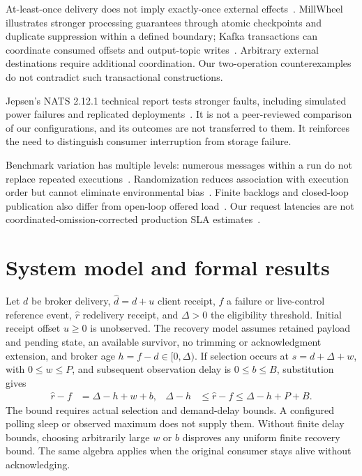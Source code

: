 \documentclass[11pt]{article}
\theoremstyle{definition}
\begin{document}
At-least-once delivery does not imply exactly-once external effects~\cite{saltzer1984,birrell1984}. MillWheel illustrates stronger processing guarantees through atomic checkpoints and duplicate suppression within a defined boundary; Kafka transactions can coordinate consumed offsets and output-topic writes~\cite{akidau2013millwheel,kafka41semantics}. Arbitrary external destinations require additional coordination. Our two-operation counterexamples do not contradict such transactional constructions.

Jepsen's NATS 2.12.1 technical report tests stronger faults, including simulated power failures and replicated deployments~\cite{kingsbury2025}. It is not a peer-reviewed comparison of our configurations, and its outcomes are not transferred to them. It reinforces the need to distinguish consumer interruption from storage failure.

Benchmark variation has multiple levels: numerous messages within a run do not replace repeated executions~\cite{kalibera2013}. Randomization reduces association with execution order but cannot eliminate environmental bias~\cite{mytkowicz2009}. Finite backlogs and closed-loop publication also differ from open-loop offered load~\cite{schroeder2006}. Our request latencies are not coordinated-omission-corrected production SLA estimates~\cite{wrk2,hdrhistogram}.

\section{System model and formal results}\label{sec:model}

Let $d$ be broker delivery, $\widehat d=d+u$ client receipt, $f$ a failure or live-control reference event, $\widehat r$ redelivery receipt, and $\Delta>0$ the eligibility threshold. Initial receipt offset $u\geq0$ is unobserved. The recovery model assumes retained payload and pending state, an available survivor, no trimming or acknowledgment extension, and broker age $h=f-d\in[0,\Delta)$. If selection occurs at $s=d+\Delta+w$, with $0\leq w\leq P$, and subsequent observation delay is $0\leq b\leq B$, substitution gives
\begin{align}
\widehat r-f&=\Delta-h+w+b, &
\Delta-h&\leq\widehat r-f\leq\Delta-h+P+B.\label{eq:residual}
\end{align}
The bound requires actual selection and demand-delay bounds. A configured polling sleep or observed maximum does not supply them. Without finite delay bounds, choosing arbitrarily large $w$ or $b$ disproves any uniform finite recovery bound. The same algebra applies when the original consumer stays alive without acknowledging.
\end{document}
